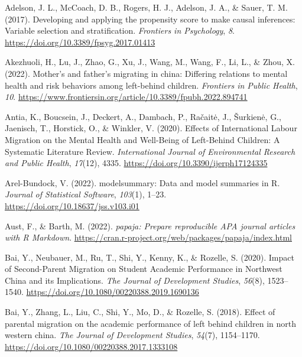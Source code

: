 \documentclass[
  man,floatsintext]{apa7}
\newlength{\cslhangindent}
\newlength{\cslentryspacingunit} %
\newenvironment{CSLReferences}[2] %
 {%
  \setlength{\parindent}{0pt}
  \ifodd #1
  \let\oldpar\par
  \def\par{\hangindent=\cslhangindent\oldpar}
  \fi
  \setlength{\parskip}{#2\cslentryspacingunit}
 }%
 {}
\begin{document}
\hypertarget{refs}{}
\begin{CSLReferences}{1}{0}
\leavevmode{}%
Adelson, J. L., McCoach, D. B., Rogers, H. J., Adelson, J. A., \& Sauer, T. M. (2017). Developing and applying the propensity score to make causal inferences: Variable selection and stratification. \emph{Frontiers in Psychology}, \emph{8}. \url{https://doi.org/10.3389/fpsyg.2017.01413}

\leavevmode{}%
Akezhuoli, H., Lu, J., Zhao, G., Xu, J., Wang, M., Wang, F., Li, L., \& Zhou, X. (2022). Mother's and father's migrating in china: Differing relations to mental health and risk behaviors among left-behind children. \emph{Frontiers in Public Health}, \emph{10}. \url{https://www.frontiersin.org/article/10.3389/fpubh.2022.894741}

\leavevmode{}%
Antia, K., Boucsein, J., Deckert, A., Dambach, P., Račaitė, J., Šurkienė, G., Jaenisch, T., Horstick, O., \& Winkler, V. (2020). Effects of International Labour Migration on the Mental Health and Well-Being of Left-Behind Children: A Systematic Literature Review. \emph{International Journal of Environmental Research and Public Health}, \emph{17}(12), 4335. \url{https://doi.org/10.3390/ijerph17124335}

\leavevmode{}%
Arel-Bundock, V. (2022). {modelsummary}: Data and model summaries in {R}. \emph{Journal of Statistical Software}, \emph{103}(1), 1--23. \url{https://doi.org/10.18637/jss.v103.i01}

\leavevmode{}%
Aust, F., \& Barth, M. (2022). \emph{{papaja}: {Prepare} reproducible {APA} journal articles with {R Markdown}}. \url{https://cran.r-project.org/web/packages/papaja/index.html}

\leavevmode{}%
Bai, Y., Neubauer, M., Ru, T., Shi, Y., Kenny, K., \& Rozelle, S. (2020). Impact of Second-Parent Migration on Student Academic Performance in Northwest China and its Implications. \emph{The Journal of Development Studies}, \emph{56}(8), 1523--1540. \url{https://doi.org/10.1080/00220388.2019.1690136}

\leavevmode{}%
Bai, Y., Zhang, L., Liu, C., Shi, Y., Mo, D., \& Rozelle, S. (2018). Effect of parental migration on the academic performance of left behind children in north western china. \emph{The Journal of Development Studies}, \emph{54}(7), 1154--1170. \url{https://doi.org/10.1080/00220388.2017.1333108}


\end{CSLReferences}
\end{document}
